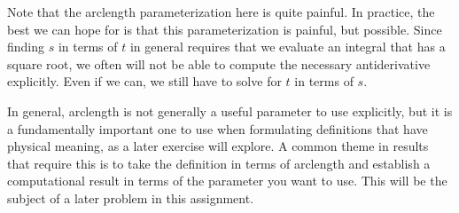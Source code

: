 \documentclass{ximera}
\begin{document}
\begin{exercise}
\begin{exercise}
\begin{feedback}[correct]
Note that the arclength parameterization here is quite painful.  In practice, the best we can hope for is that this parameterization is painful, but possible.  Since finding $s$ in terms of $t$ in general requires that we evaluate an integral that has a square root, we often will not be able to compute the necessary antiderivative explicitly.  Even if we can, we still have to solve for $t$ in terms of $s$.  

In general, arclength is not generally a useful parameter to use explicitly, but it is a fundamentally important one to use when formulating definitions that have physical meaning, as a later exercise will explore.  A common theme in results that require this is to take the definition in terms of arclength and establish a computational result in terms of the parameter you want to use.  This will be the subject of a later problem in this assignment.

\end{feedback}
\end{exercise}
 \end{exercise}
\end{document}
